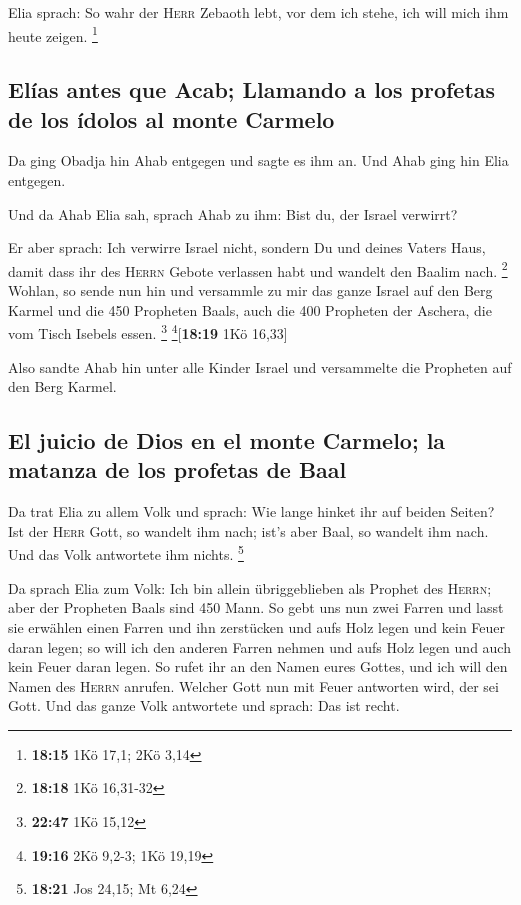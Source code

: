  Elia sprach: So wahr der \textsc{Herr} Zebaoth lebt, vor
dem ich stehe, ich will mich ihm heute zeigen. \footnote{\textbf{18:15}
  1Kö 17,1; 2Kö 3,14}

\hypertarget{eluxedas-antes-que-acab-llamando-a-los-profetas-de-los-uxeddolos-al-monte-carmelo}{%
\subsection{Elías antes que Acab; Llamando a los profetas de los ídolos
al monte
Carmelo}\label{eluxedas-antes-que-acab-llamando-a-los-profetas-de-los-uxeddolos-al-monte-carmelo}}

 Da ging Obadja hin Ahab entgegen und sagte es ihm an.
Und Ahab ging hin Elia entgegen.

 Und da Ahab Elia sah, sprach Ahab zu ihm: Bist du, der
Israel verwirrt?

 Er aber sprach: Ich verwirre Israel nicht, sondern Du
und deines Vaters Haus, damit dass ihr des \textsc{Herrn} Gebote
verlassen habt und wandelt den Baalim nach. \footnote{\textbf{18:18} 1Kö
  16,31-32}  Wohlan, so sende nun hin und versammle zu
mir das ganze Israel auf den Berg Karmel und die 450 Propheten Baals,
auch die 400 Propheten der Aschera, die vom Tisch Isebels essen.
\footnote{\textbf{22:47} 1Kö 15,12} \footnote{\textbf{19:16} 2Kö 9,2-3;
  1Kö 19,19}{[}\textbf{18:19} 1Kö 16,33{]}

 Also sandte Ahab hin unter alle Kinder Israel und
versammelte die Propheten auf den Berg Karmel.

\hypertarget{el-juicio-de-dios-en-el-monte-carmelo-la-matanza-de-los-profetas-de-baal}{%
\subsection{El juicio de Dios en el monte Carmelo; la matanza de los
profetas de
Baal}\label{el-juicio-de-dios-en-el-monte-carmelo-la-matanza-de-los-profetas-de-baal}}

 Da trat Elia zu allem Volk und sprach: Wie lange hinket
ihr auf beiden Seiten? Ist der \textsc{Herr} Gott, so wandelt ihm nach;
ist's aber Baal, so wandelt ihm nach. Und das Volk antwortete ihm
nichts. \footnote{\textbf{18:21} Jos 24,15; Mt 6,24}

 Da sprach Elia zum Volk: Ich bin allein übriggeblieben
als Prophet des \textsc{Herrn}; aber der Propheten Baals sind 450 Mann.
 So gebt uns nun zwei Farren und lasst sie erwählen einen
Farren und ihn zerstücken und aufs Holz legen und kein Feuer daran
legen; so will ich den anderen Farren nehmen und aufs Holz legen und
auch kein Feuer daran legen.  So rufet ihr an den Namen
eures Gottes, und ich will den Namen des \textsc{Herrn} anrufen. Welcher
Gott nun mit Feuer antworten wird, der sei Gott. Und das ganze Volk
antwortete und sprach: Das ist recht.

